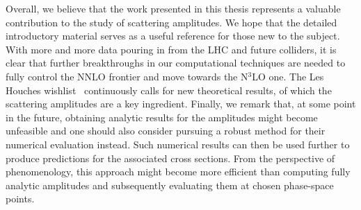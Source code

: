 \documentclass[main.tex]{subfiles}
\begin{document}
Overall, we believe that the work presented in this thesis represents a valuable contribution to the study of scattering amplitudes. We hope that the detailed introductory material serves as a useful reference for those new to the subject. With more and more data pouring in from the LHC and future colliders, it is clear that further breakthroughs in our computational techniques are needed to fully control the NNLO frontier and move towards the N$^3$LO one. The Les Houches wishlist~\cite{Huss:2022ful} continuously calls for new theoretical results, of which the scattering amplitudes are a key ingredient. Finally, we remark that, at some point in the future, obtaining analytic results for the amplitudes might become unfeasible and one should also consider pursuing a robust method for their numerical evaluation instead. Such numerical results can then be used further to produce predictions for the associated cross sections. From the perspective of phenomenology, this approach might become more efficient than computing fully analytic amplitudes and subsequently evaluating them at chosen phase-space points.
\end{document}
